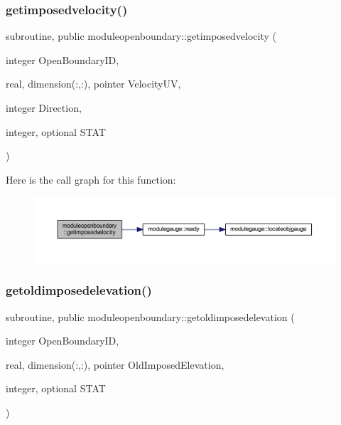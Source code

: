 \subsubsection{\texorpdfstring{getimposedvelocity()}{getimposedvelocity()}}
{\footnotesize\ttfamily subroutine, public moduleopenboundary\+::getimposedvelocity (\begin{DoxyParamCaption}\item[{integer}]{Open\+Boundary\+ID,  }\item[{real, dimension(\+:,\+:), pointer}]{Velocity\+UV,  }\item[{integer}]{Direction,  }\item[{integer, optional}]{S\+T\+AT }\end{DoxyParamCaption})}

Here is the call graph for this function\+:\nopagebreak
\begin{figure}[H]
\begin{center}
\leavevmode
\includegraphics[width=350pt]{namespacemoduleopenboundary_a4770186a431ef5de9034a0b7eb410c43_cgraph}
\end{center}
\end{figure}
\mbox{\label{namespacemoduleopenboundary_a0388d8cc14f0fdd9f898ff4cf751b093}} 
\subsubsection{\texorpdfstring{getoldimposedelevation()}{getoldimposedelevation()}}
{\footnotesize\ttfamily subroutine, public moduleopenboundary\+::getoldimposedelevation (\begin{DoxyParamCaption}\item[{integer}]{Open\+Boundary\+ID,  }\item[{real, dimension(\+:,\+:), pointer}]{Old\+Imposed\+Elevation,  }\item[{integer, optional}]{S\+T\+AT }\end{DoxyParamCaption})}

